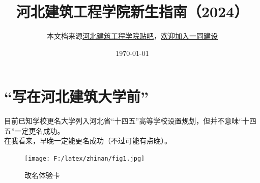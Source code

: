 \documentclass[12pt]{article} %
\title{河北建筑工程学院新生指南（2024）}
\author{本文档来源\href{https://tieba.baidu.com/p/9062077312?pn=1}{河北建筑工程学院贴吧}，\href{https://github.com/ditian-tai/HBACE-Guide-for-Freshmen}{欢迎加入一同建设}}
\date{\today} %
\begin{document}
	
	\maketitle %
	\thispagestyle{empty} %
	
	\tableofcontents %
	\clearpage
	
	\pagestyle{fancy}
	\fancyhf{} %
	\cfoot{} %
\rfoot{\color{color2}\thepage} 
	
\section{“写在河北建筑大学前”}
	

目前已知学校更名大学列入河北省“十四五”高等学校设置规划，但并不意味“十四五”一定更名成功。\\

在我看来，早晚一定能更名成功（不过可能有点晚）。\\

	\begin{figure}[!h]
	\centering
	\texttt{[image: F:/latex/zhinan/fig1.jpg]}
	\caption{改名体验卡} %
	\end{figure}
	
	\newpage
	
	
	
	
	
	
\end{document}
